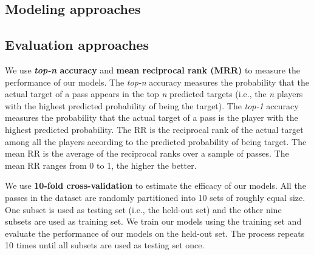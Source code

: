 \subsection{Modeling approaches}



\subsection{Evaluation approaches}

We use \textbf{\textit{top-n} accuracy} and \textbf{mean reciprocal rank (MRR)} to measure the performance of our models.
The \textit{top-n} accuracy measures the probability that the actual target of a pass appears in the top \textit{n} predicted targets (i.e., the \textit{n} players with the highest predicted probability of being the target).
The \textit{top-1} accuracy measures the probability that the actual target of a pass is the player with the highest predicted probability.
The RR is the reciprocal rank of the actual target among all the players according to the predicted probability of being target.
The mean RR is the average of the reciprocal ranks over a sample of passes. The mean RR ranges from 0 to 1, the higher the better.
 
We use \textbf{10-fold cross-validation} to estimate the efficacy of our models. All the passes in the dataset are randomly partitioned into 10 sets of roughly equal size. One subset is used as testing set (i.e., the held-out set) and the other nine subsets are used as training set. 
We train our models using the training set and evaluate the performance of our models on the held-out set.
The process repeats 10 times until all subsets are used as testing set once.
